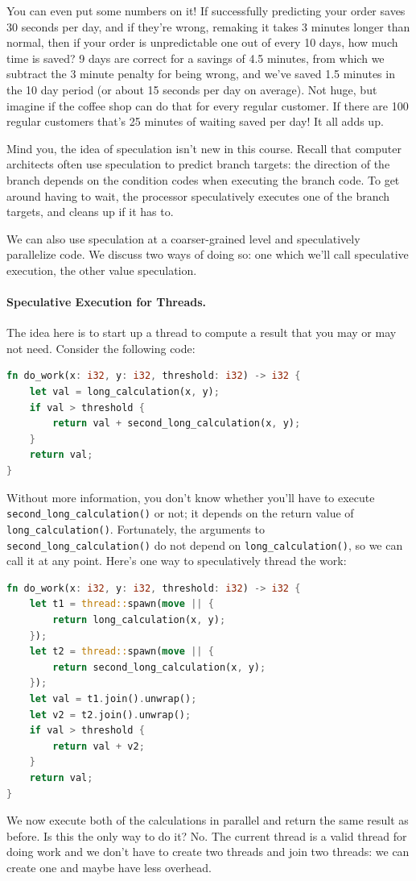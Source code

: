 \documentclass[a4paper]{report}
\begin{document}
You can even put some numbers on it! If successfully predicting your order saves 30 seconds per day, and if they're wrong, remaking it takes 3 minutes longer than normal, then if your order is unpredictable one out of every 10 days, how much time is saved? 9 days are correct for a savings of 4.5 minutes, from which we subtract the 3 minute penalty for being wrong, and we've saved 1.5 minutes in the 10 day period (or about 15 seconds per day on average). Not huge, but imagine if the coffee shop can do that for every regular customer. If there are 100 regular customers that's 25 minutes of waiting saved per day! It all adds up.

Mind you, the idea of speculation isn't new in this course.
Recall that computer architects often use speculation to predict branch
targets: the direction of the branch depends on the condition codes
when executing the branch code. To get around having to wait, the processor
speculatively executes one of the branch targets, and cleans up if it
has to.

We can also use speculation at a coarser-grained level and
speculatively parallelize code. We discuss two ways of doing so: one
which we'll call speculative execution, the other value speculation.

\paragraph{Speculative Execution for Threads.} The idea here is to
start up a thread to compute a result that you may or may not need.
Consider the following code:

\begin{lstlisting}[language=Rust]
fn do_work(x: i32, y: i32, threshold: i32) -> i32 {
    let val = long_calculation(x, y);
    if val > threshold {
        return val + second_long_calculation(x, y);
    }
    return val;
}
\end{lstlisting}
Without more information, you don't know whether you'll have to execute
{\tt second\_long\_calculation()} or not; it depends on the return value of
{\tt long\_calculation()}.  Fortunately, the arguments to {\tt second\_long\_calculation()} do not
depend on {\tt long\_calculation()}, so we can call it at any point. 
Here's one way to speculatively thread the work:

\begin{lstlisting}[language=Rust]
fn do_work(x: i32, y: i32, threshold: i32) -> i32 {
    let t1 = thread::spawn(move || {
        return long_calculation(x, y);
    });
    let t2 = thread::spawn(move || {
        return second_long_calculation(x, y);
    });
    let val = t1.join().unwrap();
    let v2 = t2.join().unwrap();
    if val > threshold {
        return val + v2;
    }
    return val;
}
\end{lstlisting}
We now execute both of the calculations in parallel and return the same
result as before. Is this the only way to do it? No. The current thread is a valid thread for doing work and we don't have to create two threads and join two threads: we can create one and maybe have less overhead.
\end{document}
